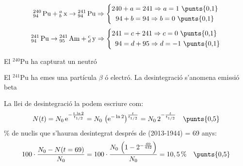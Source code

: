 \begin{solapartat}
\[ {}^{240}_{94}\,\mathrm{Pu} + {}^{a}_{b}\,\mathrm{x} \rightarrow {}^{241}_{94}\,\mathrm{Pu} \Rightarrow
\left\{\begin{aligned} 240 + a &= 241 \Rightarrow a = 1 \ \text{\punts{0,1}}\\ 94 + b &= 94 \Rightarrow b = 0 \ \text{\punts{0,1}}\end{aligned}\right. \]
\[ {}^{241}_{94}\,\mathrm{Pu} \rightarrow {}^{241}_{95}\,\mathrm{Am} + {}^{c}_{d}\,\mathrm{y} \Rightarrow
\left\{\begin{aligned} 241 &= c + 241 \Rightarrow c = 0 \ \text{\punts{0,1}}\\ 94 &= d + 95 \Rightarrow d = -1 \ \text{\punts{0,1}}\end{aligned}\right. \]

El ${}^{240}$Pu ha capturat un neutró 

El ${}^{241}$Pu ha emes una partícula $\beta$ ó electró. La desintegració s'anomena emissió beta 
\end{solapartat}

\begin{solapartat}
La llei de desintegració la podem escriure com:
\[ N(t) = N_0\,\mathrm{e}^{-\frac{t\,\ln 2}{t_{1/2}}} = N_0\,\left(\mathrm{e}^{-\ln 2}\right)^{\frac{t}{t_{1/2}}} = N_0\,2^{-\frac{t}{t_{1/2}}} \quad \text{\punts{0,5}} \]
\% de nuclis que s'hauran desintegrat després de (2013-1944) = 69 anys:
\[ 100\cdot\frac{N_0 - N(t = 69)}{N_0} = 100\cdot\frac{N_0\,\left(1 - 2^{-\frac{69}{432}}\right)}{N_0} = 10,5\,\% \quad \text{\punts{0,5}} \]
\end{solapartat}
